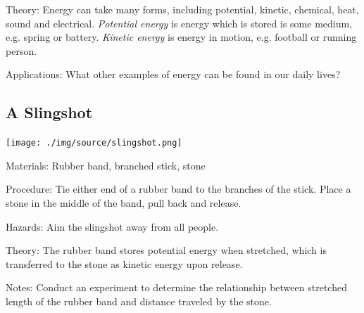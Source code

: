 \begin{multicols}{2}
\begin{description*}
\item[Theory:]{Energy can take many forms, including potential, kinetic, chemical, heat, sound and electrical. \emph{Potential energy} is energy which is stored is some medium, e.g. spring or battery. \emph{Kinetic energy} is energy in motion, e.g. football or running person.}
\item[Applications:]{What other examples of energy can be found in our daily lives?}
\end{description*}

\subsection{A Slingshot}

\begin{center}
\texttt{[image: ./img/source/slingshot.png]}
\end{center}

\begin{description*}
\item[Materials:]{Rubber band, branched stick, stone}
\item[Procedure:]{Tie either end of a rubber band to the branches of the stick. Place a stone in the middle of the band, pull back and release.}
\item[Hazards:]{Aim the slingshot away from all people.}
\item[Theory:]{The rubber band stores potential energy when stretched, which is transferred to the stone as kinetic energy upon release.}
\item[Notes:]{Conduct an experiment to determine the relationship between stretched length of the rubber band and distance traveled by the stone.}
\end{description*}


\end{multicols}
